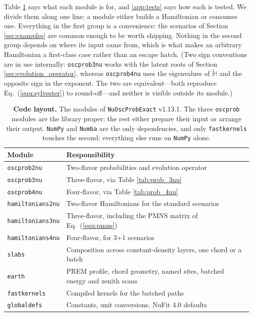 \documentclass[final,5p,times,twocolumn,sort,compress]{elsarticle}
\newcommand{\eq}{Eq.}
\newcommand{\equ}[1]{\eq~(\ref{equ:#1})}
\begin{document}
Table \ref{tab:modules} says what each module is for, and \ref{app:tests} says how each is tested.  We divide them along one line: a module either builds a Hamiltonian or consumes one.  Everything in the first group is a convenience: the scenarios of Section \ref{sec:examples} are common enough to be worth shipping.  Nothing in the second group depends on where its input came from, which is what makes an arbitrary Hamiltonian a first-class case rather than an escape hatch.  (Two sign conventions are in use internally: {\tt oscprob3nu} works with the latent roots of Section \ref{sec:evolution_operator}, whereas {\tt oscprob4nu} uses the eigenvalues of $\tilde{\mathbb{H}}$ and the opposite sign in the exponent.  The two are equivalent---both reproduce \equ{sylvester} to round-off---and neither is visible outside its module.)

{\def\arraystretch{1.2}
\begin{table}[t!]
  \begin{tabular}{ll}
   Module & Responsibility \\
   \hline
   {\tt oscprob2nu} & Two-flavor probabilities and evolution operator \\
   {\tt oscprob3nu} & Three-flavor, via Table \ref{tab:prob_3nu} \\
   {\tt oscprob4nu} & Four-flavor, via Table \ref{tab:prob_4nu} \\
   {\tt hamiltonians2nu} & Two-flavor Hamiltonians for the standard scenarios \\
   {\tt hamiltonians3nu} & Three-flavor, including the PMNS matrix of \equ{pmns} \\
   {\tt hamiltonians4nu} & Four-flavor, for 3+1 scenarios \\
   {\tt slabs} & Composition across constant-density layers, one chord or a batch \\
   {\tt earth} & PREM profile, chord geometry, named sites, batched energy and zenith scans \\
   {\tt fastkernels} & Compiled kernels for the batched paths \\
   {\tt globaldefs} & Constants, unit conversions, NuFit 4.0 defaults \\
  \end{tabular}
  \caption{\label{tab:modules}{\bf Code layout.} The modules of {\tt NuOscProbExact} v1.13.1.  The three {\tt oscprob} modules are the library proper; the rest either prepare their input or arrange their output.  {\tt NumPy} and {\tt Numba} are the only dependencies, and only {\tt fastkernels} touches the second; everything else runs on {\tt NumPy} alone.}
\end{table}
}
\end{document}
